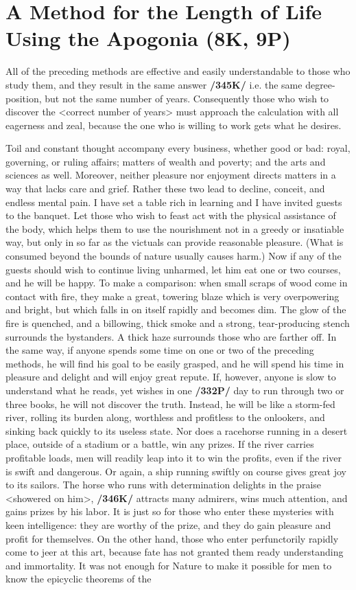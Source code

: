 \section{A Method for the Length of Life Using the Apogonia (8K, 9P)}

All of the preceding methods are effective and easily understandable to those who study them, and they result in the same answer \textbf{/345K/} i.e. the same degree-position, but not the same number of years. Consequently those who wish to discover the <correct number of years> must approach the calculation with all eagerness and zeal, because the one who is willing to work gets what he desires. 

Toil and constant thought accompany every business, whether good or bad: royal, governing, or ruling affairs; matters of wealth and poverty; and the arts and sciences as well. Moreover, neither pleasure nor enjoyment directs matters in a way that lacks care and grief. Rather these two lead to decline, conceit, and endless mental pain. I have set a table rich in learning and I have invited guests to the banquet. Let those who wish to feast act with the physical assistance of the body, which helps them to use the nourishment not in a greedy or insatiable way, but only in so far as the victuals can provide reasonable pleasure. (What is consumed beyond the bounds of nature usually causes harm.) Now if any of the guests should wish to continue living unharmed, let him eat one or two courses, and he will be happy. To make a comparison: when small scraps of wood come in contact with fire, they make a great, towering blaze which is very overpowering and bright, but which falls in on itself rapidly and becomes dim. The glow of the fire is quenched, and a billowing, thick smoke and a strong, tear-producing stench surrounds the bystanders. A thick haze surrounds those who are farther off. In the same way, if anyone spends some time on one or two of the preceding methods, he will find his goal to be easily grasped, and he will spend his time in pleasure and delight and will enjoy great repute. If, however, anyone is slow to understand what he reads, yet wishes in one \textbf{/332P/} day to run through two or three books, he will not discover the truth. Instead, he will be like a storm-fed river, rolling its burden along, worthless and profitless to the onlookers, and sinking back quickly to its useless state. Nor does a racehorse running in a desert place, outside of a stadium or a battle, win any prizes. If the river carries profitable loads, men will readily leap into it to win the profits, even if the river is swift and dangerous. Or again, a ship running swiftly on course gives great joy to its sailors. The horse who runs with determination delights in the praise <showered on him>, \textbf{/346K/} attracts many admirers, wins much attention, and gains prizes by his labor. It is just so for those who enter these mysteries with keen intelligence: they are worthy of the prize, and they do gain pleasure and profit for themselves. On the other hand, those who enter perfunctorily rapidly come to jeer at this art, because fate has not granted them ready understanding and immortality. It was not enough for Nature to make it possible for men to know the epicyclic theorems of the 